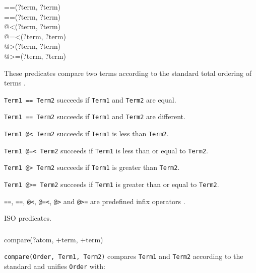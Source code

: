 \begin{TemplatesTwoCols}
==(?term, ?term)\\
{\bs}==(?term, ?term) \\
@<(?term, ?term) \\
@=<(?term, ?term)\\
@>(?term, ?term)\\
@>=(?term, ?term)

\end{TemplatesTwoCols}

\Description

These predicates compare two terms according to the standard total ordering
of terms .

\texttt{Term1 == Term2} succeeds if \texttt{Term1} and \texttt{Term2} are
equal.

\texttt{Term1 {\bs}== Term2} succeeds if \texttt{Term1} and
\texttt{Term2} are different.

\texttt{Term1 @< Term2} succeeds if \texttt{Term1} is less than
\texttt{Term2}.

\texttt{Term1 @=< Term2} succeeds if \texttt{Term1} is less than or
equal to \texttt{Term2}.

\texttt{Term1 @> Term2} succeeds if \texttt{Term1} is greater than
\texttt{Term2}.

\texttt{Term1 @>= Term2} succeeds if \texttt{Term1} is greater than
or equal to \texttt{Term2}.

\texttt{==}, \texttt{{\bs}==}, \texttt{@<}, \texttt{@=<},
\texttt{@>} and \texttt{@>=} are predefined infix operators .

\PlErrorsNone

\Portability

ISO predicates.

\subsubsection{ \label{compare/3}}

\begin{TemplatesOneCol}
compare(?atom, +term, +term)

\end{TemplatesOneCol}

\Description

\texttt{compare(Order, Term1, Term2)} compares \texttt{Term1} and
\texttt{Term2} according to the standard  and unifies \texttt{Order} with:

